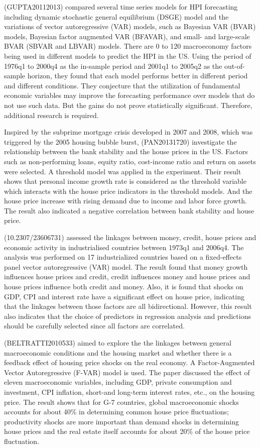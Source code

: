 \documentclass[11pt]{article}
\begin{document}
(GUPTA20112013) compared several time series models for HPI forecasting including dynamic stochastic general equilibrium (DSGE) model and the variations of vector autoregressive (VAR) models, such as Bayesian VAR (BVAR) models, Bayesian factor augmented VAR (BFAVAR), and small- and large-scale BVAR (SBVAR and LBVAR) models. There are 0 to 120 macroeconomy factors being used in different models to predict the HPI in the US. Using the period of 1976q1 to 2000q4 as the in-sample period and 2001q1 to 2005q2 as the out-of-sample horizon, they found that each model performs better in different period and different conditions. They conjecture that the utilization of fundamental economic variables may improve the forecasting performance over models that do not use such data. But the gains do not prove statistically significant. Therefore, additional research is required.

Inspired by the subprime mortgage crisis developed in 2007 and 2008, which was triggered by the 2005 housing bubble burst, (PAN20131720) investigate the relationship between the bank stability and the house prices in the US. Factors such as non-performing loans, equity ratio, cost-income ratio and return on assets were selected. A threshold model was applied in the experiment. Their result shows that personal income growth rate is considered as the threshold variable which interacts with the house price indicators in the threshold models. And the house price increase with rising demand due to income and labor force growth. The result also indicated a negative correlation between bank stability and house price.

(10.2307/23606731) assessed the linkages between money, credit, house prices and economic activity in industrialised countries between 1973q1 and 2006q4. The analysis was performed on 17 industrialized countries based on a fixed-effects panel vector autoregressive (VAR) model. The result found that money growth influences house prices and credit, credit influences money and house prices and house prices influence both credit and money. Also, it is found that shocks on GDP, CPI and interest rate have a significant effect on house price, indicating that the linkages between those factors are all bidirectional. However, this result also indicates that the choice of predictors in regression analysis and predictions should be carefully selected since all factors are correlated.

(BELTRATTI2010533) aimed to explore the the linkages between general macroeconomic conditions and the housing market and whether there is a feedback effect of housing price shocks on the real economy. A Factor-Augmented Vector Autoregressive (F-VAR) model is used. The paper discussed the effect of eleven macroeconomic variables, including GDP, private consumption and investment, CPI inflation, short-and long-term interest rates, etc., on the housing price. The result shows that for G-7 countries, global macroeconomic shocks accounts for about 40\% in determining common house price fluctuations; productivity shocks are more important than demand shocks in determining house prices and the real estate itself accounts for about 20\% of the house price fluctuation.
\end{document}
